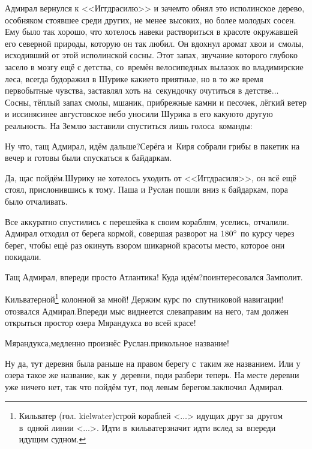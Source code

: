 Адмирал вернулся к <<Иггдрасилю>> и зачем\sdash то обнял это исполинское дерево, особняком стоявшее среди других, не менее высоких, но более молодых сосен. Ему было так хорошо, что хотелось навеки раствориться в красоте окружавшей его северной природы, которую он так любил. Он вдохнул аромат хвои и~смолы, исходивший от этой исполинской сосны. Этот запах, звучание которого глубоко засело в мозгу ещё с детства, со~времён велосипедных вылазок во владимирские леса, всегда будоражил в Шурике какие\sdash то приятные, но в то же время первобытные чувства, заставлял хоть на~секундочку очутиться в детстве$\ldots$ Сосны, тёплый запах смолы, мшаник, прибрежные камни и песочек, лёгкий ветер и иссиня\sdash синее августовское небо уносили Шурика в его какую\sdash то другую реальность. На Землю заставили спуститься лишь голоса~команды:

\diagdash Ну что, тащ Адмирал, идём дальше?\mdash Серёга и~Киря собрали грибы в пакетик на вечер и готовы были спускаться к байдаркам.

\diagdash Да, щас пойдём.\mdash Шурику не хотелось уходить от <<Иггдрасиля>>, он всё ещё стоял, прислонившись к тому. Паша и Руслан пошли вниз к байдаркам, пора было отчаливать.

Все аккуратно спустились с перешейка к своим кораблям, уселись, отчалили. Адмирал отходил от берега кормой, совершая разворот на $180\degree$ по курсу через берег, чтобы ещё раз окинуть взором шикарной красоты место, которое они покидали. 

\diagdash Тащ Адмирал, впереди просто Атлантика! Куда идём?\mdash поинтересовался Замполит.

\renewcommand*{\thefootnote}{\fnsymbol{footnote}}
\setcounter{footnote}{0}
\diagdash Кильватерной\footnote{Кильватер (гол. kielwater)\mdash строй кораблей <$\dots$> идущих друг за~другом в~одной линии <$\dots$>. Идти в~кильватер\mdash значит идти вслед за~впереди идущим судном.} колонной за мной! Держим курс по~спутниковой навигации!\mdash отозвался Адмирал.\mdash Впереди мыс виднеется слева\mdash правим на него, там должен открыться простор озера Мярандукса во всей красе!

\diagdash Мярандукса,\mdash медленно произнёс Руслан.\mdash прикольное название!

\diagdash Ну да, тут деревня была раньше на правом берегу с~таким же названием. Или у озера такое же название, как у~деревни, поди разбери теперь. На месте деревни уже ничего нет, так что пойдём тут, под левым берегом.\mdash заключил Адмирал.

